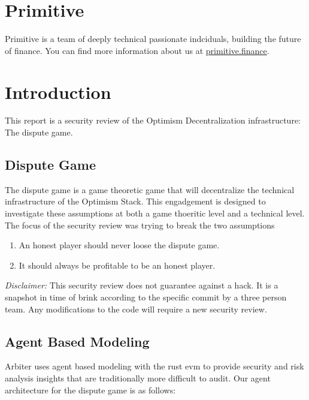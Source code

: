 \section{Primitive}\label{primitive}

Primitive is a team of deeply technical passionate indciduals, building
the future of finance.
You can find more information about us at \href{https://primitive.finance}{primitive.finance}.

\section{Introduction}\label{introduction}

This report is a security review of the Optimism Decentralization infrastructure: The dispute game.

\subsection{Dispute Game}\label{dispute-game}

The dispute game is a game theoretic game that will decentralize the technical infrastructure of the Optimism Stack.
This engadgement is designed to investigate these assumptions at both a game thoeritic level and a technical level.
The focus of the security review was trying to break the two assumptions

\begin{enumerate}
  \tightlist
  \item An honest player should never loose the dispute game.
  \item It should always be profitable to be an honest player.
\end{enumerate}

\emph{Disclaimer:} This security review does not guarantee against a
hack. It is a snapshot in time of brink according to the specific commit
by a three person team. Any modifications to the code will require a new
security review.

\subsection{Agent Based Modeling}\label{agent-based-modeling}

Arbiter uses agent based modeling with the rust evm to provide security
and risk analysis insights that are traditionally more difficult to
audit. Our agent architecture for the dispute game is as follows:

